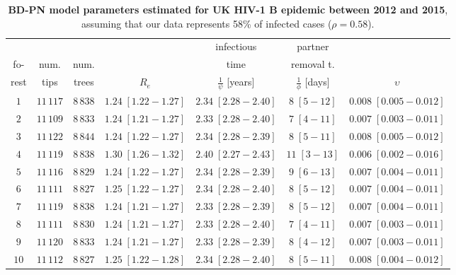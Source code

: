 \documentclass[10pt,letterpaper]{article}
\begin{document}
\begin{table}[!ht]
\begin{adjustwidth}{-0.8in}{0in} %
\centering
\caption{
{\bf BD-PN model parameters estimated for UK HIV-1 B epidemic between 2012 and 2015}, assuming that our data represents 58\% of infected cases ($\rho=0.58$).}

\begin{tabular}{c|cc|cccc}
&&&&infectious&partner&\\
fo-&num.&num.&&time&removal t.&\\
rest&tips&trees&$R_e$&$\frac{1}{\psi}$ [years]& $\frac{1}{\phi}$ [days]&$\upsilon$\\
\toprule
  $1$ & $11\,117$ & $8\,838$ & $1.24\;[1.22-1.27]$& $2.34\;[2.28-2.40]$& $8\;[5-12]$& $0.008\;[0.005-0.012]$ \\
 $2$ & $11\,109$ & $8\,833$ & $1.24\;[1.21-1.27]$& $2.33\;[2.28-2.40]$& $7\;[4-11]$& $0.007\;[0.003-0.011]$ \\
 $3$ & $11\,122$ & $8\,844$ & $1.24\;[1.22-1.27]$& $2.34\;[2.28-2.39]$& $8\;[5-11]$& $0.008\;[0.005-0.012]$ \\
 $4$ & $11\,119$ & $8\,838$ & $1.30\;[1.26-1.32]$& $2.40\;[2.27-2.43]$& $11\;[3-13]$& $0.006\;[0.002-0.016]$ \\
 $5$ & $11\,116$ & $8\,829$ & $1.24\;[1.22-1.27]$& $2.34\;[2.28-2.39]$& $9\;[6-13]$& $0.007\;[0.004-0.011]$ \\
 $6$ & $11\,111$ & $8\,827$ & $1.25\;[1.22-1.27]$& $2.34\;[2.28-2.40]$& $8\;[5-12]$& $0.007\;[0.004-0.011]$ \\
 $7$ & $11\,119$ & $8\,838$ & $1.24\;[1.21-1.27]$& $2.33\;[2.28-2.39]$& $8\;[5-12]$& $0.007\;[0.004-0.011]$ \\
 $8$ & $11\,111$ & $8\,830$ & $1.24\;[1.21-1.27]$& $2.33\;[2.28-2.40]$& $7\;[4-11]$& $0.007\;[0.003-0.011]$ \\
 $9$ & $11\,120$ & $8\,833$ & $1.24\;[1.21-1.27]$& $2.33\;[2.28-2.39]$& $8\;[4-12]$& $0.007\;[0.003-0.011]$ \\
 $10$ & $11\,112$ & $8\,827$ & $1.25\;[1.22-1.28]$& $2.34\;[2.28-2.40]$& $8\;[5-11]$& $0.008\;[0.004-0.012]$ \\
 \bottomrule
 \end{tabular}
\label{tbl:uk}
\end{adjustwidth}
\end{table}
\end{document}
